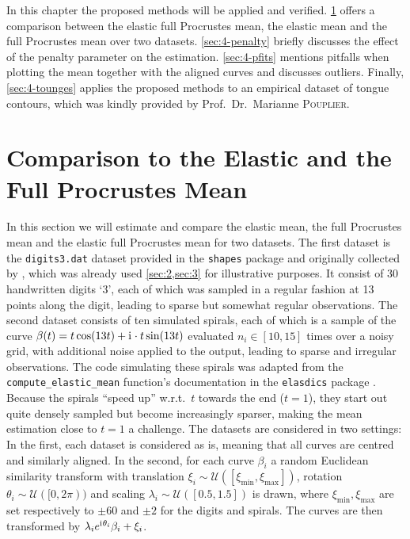 \label{sec:4}
In this chapter the proposed methods will be applied and verified.
\cref{sec:4-means} offers a comparison between the elastic full Procrustes mean, the elastic mean and the full Procrustes mean over two datasets.
\cref{sec:4-penalty} briefly discusses the effect of the penalty parameter on the estimation.
\cref{sec:4-pfits} mentions pitfalls when plotting the mean together with the aligned curves and discusses outliers.
Finally, \cref{sec:4-tounges} applies the proposed methods to an empirical dataset of tongue contours, which was kindly provided by Prof.\ Dr.\ Marianne \textsc{Pouplier}.


\section{Comparison to the Elastic and the Full Procrustes Mean}
\label{sec:4-means}
In this section we will estimate and compare the elastic mean, the full Procrustes mean and the elastic full Procrustes mean for two datasets.
The first dataset is the \texttt{digits3.dat} dataset provided in the \texttt{shapes} package \parencite{shapes} and originally collected by \cite{Anderson1997}, which was already used \cref{sec:2,sec:3} for illustrative purposes.
It consist of 30 handwritten digits \enquote*{3}, each of which was sampled in a regular fashion at 13 points along the digit, leading to sparse but somewhat regular observations.
The second dataset consists of ten simulated spirals, each of which is a sample of the curve $\beta(t) = t \cos(13t) + \mathrm{i}\mkern1mu \cdot t \sin(13t)$ evaluated $n_i \in [10,15]$ times over a noisy grid, with additional noise applied to the output, leading to sparse and irregular observations.
The code simulating these spirals was adapted from the \texttt{compute\_elastic\_mean} function's documentation in the \texttt{elasdics} package \parencite{elasdics}.
Because the spirals \enquote{speed up} w.r.t.\ $t$ towards the end ($t = 1$), they start out quite densely sampled but become increasingly sparser, making the mean estimation close to $t=1$ a challenge.
The datasets are considered in two settings:
In the first, each dataset is considered as is, meaning that all curves are centred and similarly aligned.
In the second, for each curve $\beta_i$ a random Euclidean similarity transform with translation $\xi_i \sim \mathcal{U}([\xi_\mathrm{min}, \xi_\mathrm{max}])$, rotation $\theta_i \sim \mathcal{U}([0,2\pi))$ and scaling $\lambda_i \sim \mathcal{U}([0.5,1.5])$ is drawn, where $\xi_\mathrm{min}, \xi_\mathrm{max}$ are set respectively to $\pm 60$ and $\pm 2$ for the digits and spirals.
The curves are then transformed by $\lambda_i e^{\mathrm{i}\mkern1mu \theta_i} \beta_i + \xi_i$.

